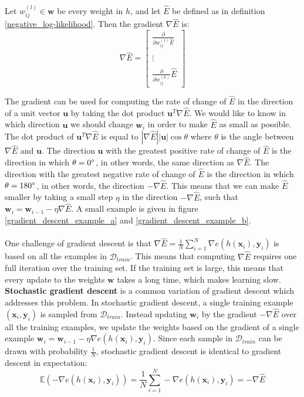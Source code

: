 \begin{definition}[gradient]
	\label{gradient}
	Let $w^{(l)}_{ij} \in \mathbf{w}$ be every weight in $h$, and let $\hat{E}$ be defined as in definition \ref{negative_log-likelihood}. Then the gradient $\nabla \hat{E}$ is:
	$$
	\nabla \hat{E} = \begin{bmatrix} \frac{\partial}{\partial w^{(1)}_{ij}\hat{E}} \\ \\ \vdots \\ \\ \frac{\partial}{\partial w^{(L)}_{ij}}\hat{E}\end{bmatrix}
	$$
\end{definition}
The gradient can be used for computing the rate of change of $\hat{E}$ in the direction of a unit vector $\mathbf{u}$ by taking the dot product $\mathbf{u}^T\nabla \hat{E}$. We would like to know in which direction $\mathbf{u}$ we should change $\mathbf{w}_i$ in order to make $\hat{E}$ as small as possible. The dot product of $\mathbf{u}^T\nabla \hat{E}$ is equal to $|\nabla \hat{E}||\mathbf{u}|\cos \theta$ where $\theta$ is the angle between $\nabla \hat{E}$ and $\mathbf{u}$. The direction $\mathbf{u}$ with the greatest positive rate of change of $\hat{E}$ is the direction in which $\theta = 0\degree$, in other words, the same direction as $\nabla \hat{E}$. The direction with the greatest negative rate of change of $\hat{E}$ is the direction in which $\theta = 180\degree$, in other words, the direction $-\nabla \hat{E}$. This means that we can make $\hat{E}$ smaller by taking a small step $\eta$ in the direction $-\nabla \hat{E}$, such that $\mathbf{w}_i = \mathbf{w}_{i-1} - \eta\nabla\hat{E}$. A small example is given in figure \ref{gradient_descent_example_a} and \ref{gradient_descent_example_b}.
\\\\
One challenge of gradient descent is that $\nabla \hat{E} = \frac{1}{N}\sum_{i=1}^N\nabla e(h(\mathbf{x}_i), \mathbf{y}_i)$ is based on all the examples in $\mathcal{D}_{train}$. This means that computing $\nabla \hat{E}$ requires one full iteration over the training set. If the training set is large, this means that every update to the weights $\mathbf{w}$ takes a long time, which makes learning slow. \textbf{Stochastic gradient descent} is a common variation of gradient descent which addresses this problem. In stochastic gradient descent, a single training example $(\mathbf{x}_i, \mathbf{y}_i)$ is sampled from $\mathcal{D}_{train}$. Instead updating $\mathbf{w}_i$ by the gradient $-\nabla \hat{E}$ over all the training examples, we update the weights based on the gradient of a single example $\mathbf{w}_i = \mathbf{w}_{i-1}-\eta\nabla e(h(\mathbf{x}_i), \mathbf{y}_i)$. Since each sample in $\mathcal{D}_{train}$ can be drawn with probability $\frac{1}{N}$, stochastic gradient descent is identical to gradient descent in expectation:
$$
\mathbb{E}(-\nabla e(h(\mathbf{x}_i), \mathbf{y}_i)) = \frac{1}{N}\sum\limits_{i=1}^N -\nabla e(h(\mathbf{x}_i), \mathbf{y}_i) = -\nabla\hat{E}
$$

